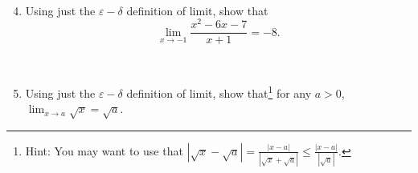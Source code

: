 \documentclass[12pt]{amsart}
\newcommand{\e}{\varepsilon}
\begin{document}
\

\begin{enumerate}\setcounter{enumi}{3}



\item Using just the $\e-\delta$ definition of limit, show that
\[ \lim_{x\to -1} \frac{x^2 - 6x - 7}{x+1} = -8.\]

\

\item Using just the $\e-\delta$ definition of limit, show that\footnote{Hint: You may want to use that $\displaystyle |\sqrt{x} - \sqrt{a} | = \frac{ |x-a| }{|\sqrt{x} + \sqrt{a} | }\leq\frac{ |x-a| }{|\sqrt{a} |}.$} for any $a>0$, $\lim_{x\to a} \sqrt{x} = \sqrt{a}$.




\end{enumerate}
\end{document}
